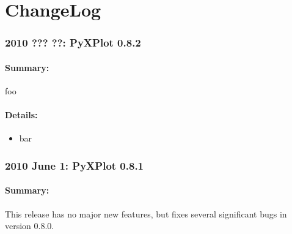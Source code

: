 %
%
%
%
%



\chapter{ChangeLog}

\subsection*{2010 ??? ??: PyXPlot 0.8.2}

\subsubsection*{Summary:}

foo

\subsubsection*{Details:}

\begin{itemize}
\item bar
\end{itemize}

\subsection*{2010 June 1: PyXPlot 0.8.1}

\subsubsection*{Summary:}

This release has no major new features, but fixes several significant bugs in version 0.8.0.

